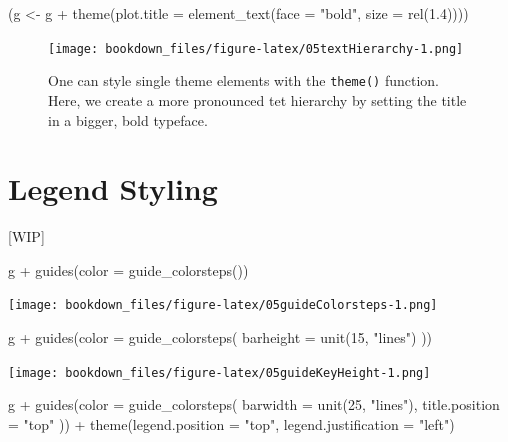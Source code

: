 \documentclass[
]{krantz}
\makeatletter
\newenvironment{Shaded}{\begin{snugshade}}{\end{snugshade}}
\newcommand{\AttributeTok}[1]{\textcolor[rgb]{0.61,0.61,0.61}{#1}}
\newcommand{\DecValTok}[1]{\textcolor[rgb]{0.06,0.06,0.06}{#1}}
\newcommand{\FloatTok}[1]{\textcolor[rgb]{0.06,0.06,0.06}{#1}}
\newcommand{\FunctionTok}[1]{\textcolor[rgb]{0,0,0}{#1}}
\newcommand{\NormalTok}[1]{#1}
\newcommand{\OtherTok}[1]{\textcolor[rgb]{0.37,0.37,0.37}{#1}}
\newcommand{\SpecialCharTok}[1]{\textcolor[rgb]{0,0,0}{#1}}
\newcommand{\StringTok}[1]{\textcolor[rgb]{0.5,0.5,0.5}{#1}}
\newenvironment{kframe}{%
\medskip{}
\setlength{\fboxsep}{.8em}
 \def\at@end@of@kframe{}%
 \ifinner\ifhmode%
  \def\at@end@of@kframe{\end{minipage}}%
  \begin{minipage}{\columnwidth}%
 \fi\fi%
 \def\FrameCommand##1{\hskip\@totalleftmargin \hskip-\fboxsep
 \colorbox{shadecolor}{##1}\hskip-\fboxsep
     \hskip-\linewidth \hskip-\@totalleftmargin \hskip\columnwidth}%
 \MakeFramed {\advance\hsize-\width
   \@totalleftmargin\z@ \linewidth\hsize
   \@setminipage}}%
 {\par\unskip\endMakeFramed%
 \at@end@of@kframe}
\renewenvironment{Shaded}{\begin{kframe}}{\end{kframe}}
\makeatother
\begin{document}
\begin{Shaded}
\begin{Highlighting}[]
\NormalTok{(g }\OtherTok{\textless{}{-}}\NormalTok{ g }\SpecialCharTok{+} \FunctionTok{theme}\NormalTok{(}\AttributeTok{plot.title =} \FunctionTok{element\_text}\NormalTok{(}\AttributeTok{face =} \StringTok{"bold"}\NormalTok{, }\AttributeTok{size =} \FunctionTok{rel}\NormalTok{(}\FloatTok{1.4}\NormalTok{))))}
\end{Highlighting}
\end{Shaded}

\begin{figure}
\centering
\texttt{[image: bookdown\_files/figure-latex/05textHierarchy-1.png]}
\caption{\label{fig:05textHierarchy}One can style single theme elements with the \texttt{theme()} function. Here, we create a more pronounced tet hierarchy by setting the title in a bigger, bold typeface.}
\end{figure}

\hypertarget{legend-styling}{%
\section{Legend Styling}\label{legend-styling}}

{[}WIP{]}

\begin{Shaded}
\begin{Highlighting}[]
\NormalTok{g }\SpecialCharTok{+} \FunctionTok{guides}\NormalTok{(}\AttributeTok{color =} \FunctionTok{guide\_colorsteps}\NormalTok{())}
\end{Highlighting}
\end{Shaded}

\texttt{[image: bookdown\_files/figure-latex/05guideColorsteps-1.png]}

\begin{Shaded}
\begin{Highlighting}[]
\NormalTok{g }\SpecialCharTok{+} \FunctionTok{guides}\NormalTok{(}\AttributeTok{color =} \FunctionTok{guide\_colorsteps}\NormalTok{(}
    \AttributeTok{barheight =} \FunctionTok{unit}\NormalTok{(}\DecValTok{15}\NormalTok{, }\StringTok{"lines"}\NormalTok{)}
\NormalTok{  ))}
\end{Highlighting}
\end{Shaded}

\texttt{[image: bookdown\_files/figure-latex/05guideKeyHeight-1.png]}

\begin{Shaded}
\begin{Highlighting}[]
\NormalTok{g }\SpecialCharTok{+} \FunctionTok{guides}\NormalTok{(}\AttributeTok{color =} \FunctionTok{guide\_colorsteps}\NormalTok{(}
    \AttributeTok{barwidth =} \FunctionTok{unit}\NormalTok{(}\DecValTok{25}\NormalTok{, }\StringTok{"lines"}\NormalTok{), }\AttributeTok{title.position =} \StringTok{"top"}
\NormalTok{  )) }\SpecialCharTok{+}
  \FunctionTok{theme}\NormalTok{(}\AttributeTok{legend.position =} \StringTok{"top"}\NormalTok{, }\AttributeTok{legend.justification =} \StringTok{"left"}\NormalTok{)}
\end{Highlighting}
\end{Shaded}
\end{document}
